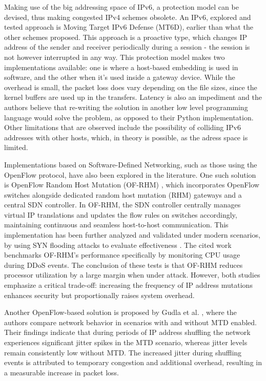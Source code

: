 Making use of the big addressing space of IPv6, a protection model can be devised, thus making congested IPv4 schemes obsolete. An IPv6, explored and tested approach is Moving Target IPv6 Defense (MT6D)\cite{dunlop2011}, earlier than what the other schemes proposed. This approach is a proactive type, which changes IP address of the sender and receiver periodically during a session - the session is not however interrupted in any way. This protection model makes two implementations available: one is where a host-based embedding is used in software, and the other when it's used inside a gateway device. While the overhead is small, the packet loss does vary depending on the file sizes, since the kernel buffers are used up in the transfers. Latency is also an impediment and the authors believe that re-writing the solution in another low level programming language would solve the problem, as opposed to their Python implementation. Other limitations that are observed include the possibility of colliding IPv6 addresses with other hosts, which, in theory is possible, as the adress space is limited. 

Implementations based on Software-Defined Networking, such as those using the OpenFlow protocol, have also been explored in the literature. One such solution is OpenFlow Random Host Mutation (OF-RHM) \cite{jafarian2012}, which incorporates OpenFlow switches alongside dedicated random host mutation (RHM) gateways and a central SDN controller. In OF-RHM, the SDN controller centrally manages virtual IP translations and updates the flow rules on switches accordingly, maintaining continuous and seamless host-to-host communication. This implementation has been further analyzed and validated under modern scenarios, by using SYN flooding attacks to evaluate effectiveness \cite{rochak2023}. The cited work benchmarks OF-RHM's performance specifically by monitoring CPU usage during DDoS events. The conclusion of these tests is that OF-RHM reduces processor utilization by a large margin when under attack. However, both studies emphasize a critical trade-off: increasing the frequency of IP address mutations enhances security but proportionally raises system overhead.

Another OpenFlow-based solution is proposed by Gudla et al. \cite{gudla2016}, where the authors compare network behavior in scenarios with and without MTD enabled. Their findings indicate that during periods of IP address shuffling the network experiences significant jitter spikes in the MTD scenario, whereas jitter levels remain consistently low without MTD. The increased jitter during shuffling events is attributed to temporary congestion and additional overhead, resulting in a measurable increase in packet loss.


